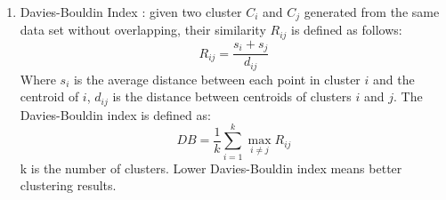 \begin{enumerate}
    \item Davies-Bouldin Index \cite{davies1979cluster}: given two cluster $C_i$ and $C_j$ generated from the same data set without overlapping, their similarity $R_{ij}$ is defined as follows:
    \begin{equation}
        R_{ij} = \frac{s_i + s_j}{d_{ij}}
    \end{equation}
    Where $s_i$ is the average distance between each point in cluster $i$ and the centroid of $i$, $d_{ij}$ is the distance between centroids of clusters $i$ and $j$. The Davies-Bouldin index is defined as:
    \begin{equation}
        DB = \frac{1}{k} \sum_{i=1}^k\max_{i\neq j}R_{ij}
    \end{equation}
    k is the number of clusters. Lower Davies-Bouldin index means better clustering results.
\end{enumerate}

